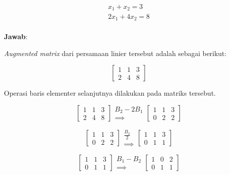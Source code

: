 \documentclass[]{book}
\theoremstyle{definition}
\theoremstyle{definition}
\theoremstyle{definition}
\theoremstyle{remark}
\begin{document}
\[
\begin{matrix}
  x_1+x_2=3 \\
  2x_1+4x_2=8 \\
\end{matrix}
\]

\textbf{Jawab}:

\emph{Augmented matrix} dari persamaan linier tersebut adalah sebagai berikut:

\[
\begin{bmatrix}
     1 & 1 & 3     \\[0.3em]
     2 & 4 & 8
\end{bmatrix}
\]

Operasi baris elementer selanjutnya dilakukan pada matriks tersebut.

\begin{equation*}
\begin{bmatrix}
     1 & 1 & 3     \\[0.3em]
     2 & 4 & 8
\end{bmatrix}
\begin{matrix}
  B_2-2B_1 \\
  \implies 
\end{matrix}
\begin{bmatrix}
     1 & 1 & 3     \\[0.3em]
     0 & 2 & 2
\end{bmatrix}
\end{equation*}

\begin{equation*}
\begin{bmatrix}
     1 & 1 & 3     \\[0.3em]
     0 & 2 & 2
\end{bmatrix}
\begin{matrix}
  \frac{B_2}{2} \\
  \implies
\end{matrix}
\begin{bmatrix}
     1 & 1 & 3     \\[0.3em]
     0 & 1 & 1
\end{bmatrix}
\end{equation*}

\begin{equation*}
\begin{bmatrix}
     1 & 1 & 3     \\[0.3em]
     0 & 1 & 1
\end{bmatrix}
\begin{matrix}
  B_1-B_2 \\
  \implies
\end{matrix}
\begin{bmatrix}
     1 & 0 & 2     \\[0.3em]
     0 & 1 & 1
\end{bmatrix}
\end{equation*}
\end{document}
